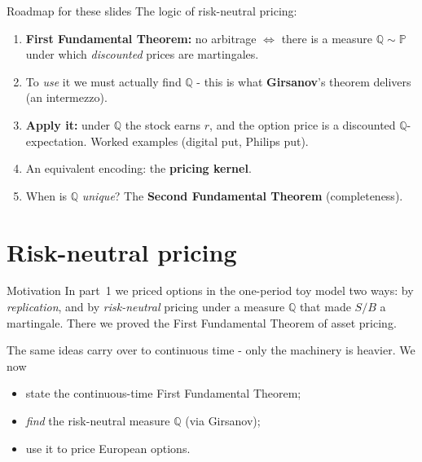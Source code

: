 \documentclass[pdf, handout]{beamer}
\begin{document}
\begin{frame}{Roadmap for these slides}
The logic of risk-neutral pricing:
\begin{enumerate}
\item \textbf{First Fundamental Theorem:} no arbitrage $\Leftrightarrow$ there is a measure $\mathbb{Q}\sim\mathbb{P}$ under which \emph{discounted} prices are martingales.
\item To \emph{use} it we must actually find $\mathbb{Q}$ - this is what \textbf{Girsanov}'s theorem delivers (an intermezzo).
\item \textbf{Apply it:} under $\mathbb{Q}$ the stock earns $r$, and the option price is a discounted $\mathbb{Q}$-expectation. Worked examples (digital put, Philips put).
\item An equivalent encoding: the \textbf{pricing kernel}.
\item When is $\mathbb{Q}$ \emph{unique}? The \textbf{Second Fundamental Theorem} (completeness).
\end{enumerate}
\end{frame}

\section{Risk-neutral pricing}

\begin{frame}{Motivation}
In part~1 we priced options in the one-period toy model two ways: by \emph{replication}, and by \emph{risk-neutral} pricing under a measure $\mathbb{Q}$ that made $S/B$ a martingale. There we proved the First Fundamental Theorem of asset pricing.
\medskip

The same ideas carry over to continuous time - only the machinery is heavier. We now
\begin{itemize}
\item state the continuous-time First Fundamental Theorem;
\item \emph{find} the risk-neutral measure $\mathbb{Q}$ (via Girsanov);
\item use it to price European options.
\end{itemize}
\end{frame}
\end{document}
